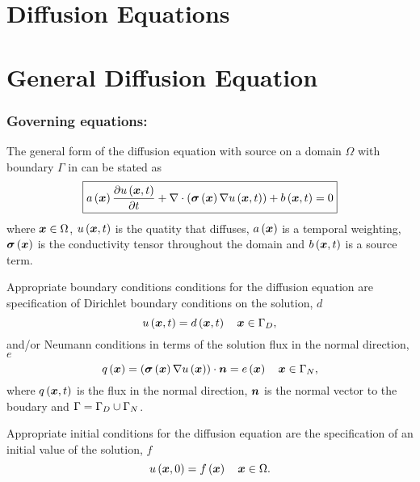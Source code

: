 \section{Diffusion Equations} 

\section{General Diffusion Equation} 

\subsubsection{Governing equations:}

The general form of the diffusion equation with source on a domain $\Omega$ with boundary
$\Gamma$ in \OpenCMISS can be stated as
\begin{equation}
  \boxed{
    \fnof{a}{\vectr{x}}\delby{\fnof{u}{\vectr{x},t}}{t}+
    \divergence{}{\pbrac{\fnof{\tensor{\sigma}}{\vectr{x}}\gradient{}{\fnof{u}{\vectr{x},t}}}}+
    \fnof{b}{\vectr{x},t}=0  
  }
  \label{eqn:diffusionequation}
\end{equation}
where $\boldsymbol{x}\in\Omega$, $ u\left( \boldsymbol{x},t \right) $ is the quatity that diffuses,
$ a\left( \boldsymbol{x} \right) $ is a temporal weighting, $ \boldsymbol{\mathit{\sigma}}\left( \boldsymbol{x} \right) $ is
the conductivity tensor throughout the domain and $ b\left( \boldsymbol{x},t \right) $ is a
source term.

Appropriate boundary conditions conditions for the diffusion
equation are specification of Dirichlet boundary conditions on the solution,
$d$ \ie
\begin{equation}
  \fnof{u}{\vectr{x},t} = \fnof{d}{\vectr{x},t} \quad \vectr{x}\in\Gamma_{D},
  \label{eqn:diffusionDirichletBC} 
\end{equation}
and/or Neumann conditions in terms of the solution flux in the normal
direction, $e$ \ie
\begin{equation}
  \fnof{q}{\vectr{x}} = \dotprod{\pbrac{\fnof{\tensor{\sigma}}{\vectr{x}}
      \gradient{}{\fnof{u}{\vectr{x}}}}}{\normal} =
  \fnof{e}{\vectr{x}} \quad \vectr{x}\in\Gamma_{N},
  \label{eqn:diffusionNeumannBC} 
\end{equation}
where $ q\left( \boldsymbol{x},t \right) $ is the flux in the normal direction, $\boldsymbol{n}$ is the normal
vector to the boudary and $\Gamma=\Gamma_{D}\cup\Gamma_{N}$.

Appropriate initial conditions for the diffusion equation are the
specification of an initial value of the solution, $f$ \ie
\begin{equation}
  \fnof{u}{\vectr{x},0} = \fnof{f}{\vectr{x}} \quad \vectr{x}\in\Omega.
  \label{eqn:diffusionInitialC} 
\end{equation}

